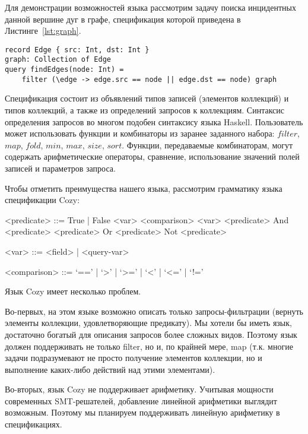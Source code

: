 \documentclass[14pt]{matmex-diploma}
\begin{document}
Для демонстрации возможностей языка рассмотрим задачу поиска инцидентных данной вершине дуг в графе, спецификация которой приведена в Листинге~\ref{lst:graph}.

\begin{lstlisting}[caption={Поиск инцидентных данной вершине дуг в графе},captionpos=t,label={lst:graph}]
record Edge { src: Int, dst: Int }
graph: Collection of Edge
query findEdges(node: Int) =
    filter (\edge -> edge.src == node || edge.dst == node) graph
\end{lstlisting}

Спецификация состоит из объявлений типов записей (элементов коллекций) и типов коллекций, а также из определений запросов к коллекциям. Синтаксис определения запросов во многом подобен синтаксису языка Haskell. Пользователь может использовать функции и комбинаторы из заранее заданного набора: $filter$, $map$, $fold$, $min$, $max$, $size$, $sort$. Функции, передаваемые комбинаторам, могут содержать арифметические операторы, сравнение, использование значений полей записей и параметров запроса.

Чтобы отметить преимущества нашего языка, рассмотрим грамматику языка спецификации Cozy:

\begin{grammar}
<predicate> ::= True | False 
\alt <var> <comparison> <var> 
\alt <predicate> And <predicate> \alt <predicate> Or <predicate>
\alt Not <predicate>
\end{grammar}

\begin{grammar}
<var> ::= <field> | <query-var>
\end{grammar}

\begin{grammar}
<comparison> ::= `==' | `>' | `>=' | `<' | `<=' | `!='
\end{grammar}
Язык Cozy имеет несколько проблем.

Во-первых, на этом языке возможно описать только запросы-фильтрации (вернуть элементы коллекции, удовлетворяющие предикату). Мы хотели бы иметь язык, достаточно богатый для описания запросов более сложных видов. Поэтому язык должен поддерживать не только filter, но и, по крайней мере, map (т.к. многие задачи подразумевают не просто получение элементов коллекции, но и выполнение каких-либо действий над этими элементами).

Во-вторых, язык Cozy не поддерживает арифметику. Учитывая мощности современных SMT-решателей, добавление линейной арифметики выглядит возможным. Поэтому мы планируем поддерживать линейную арифметику в спецификациях.


\setmonofont[Mapping=tex-text]{CMU Typewriter Text}


\end{document}

